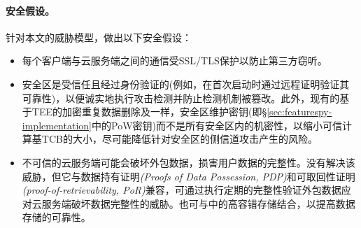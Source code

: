 \paragraph*{安全假设。}针对本文的威胁模型，做出以下安全假设：
\begin{itemize}
    \item 每个客户端与云服务端之间的通信受SSL/TLS保护以防止第三方窃听。
    \item 安全区是受信任且经过身份验证的(例如，在首次启动时通过远程证明验证其可靠性)，以便诚实地执行攻击检测并防止检测机制被篡改。此外，现有的基于TEE的加密重复数据删除\cite{shinde20}及\sysnameS 一样，安全区维护密钥(即\S\ref{sec:featurespy-implementation}中的PoW密钥)而不是所有安全区内的机密性，以缩小可信计算基TCB的大小，尽可能降低针对安全区的侧信道攻击产生的风险\cite{fei21}。
    \item 不可信的云服务端可能会破坏外包数据，损害用户数据的完整性。\sysnameF 没有解决该威胁，但它与数据持有证明\textit{(Proofs of Data Possession, PDP)}\cite{ateniese2007provable}和可取回性证明\textit{(proof-of-retrievability, PoR)}\cite{juels2007pors}兼容，可通过执行定期的完整性验证外包数据应对云服务端破坏数据完整性的威胁。\sysnameF 也可与\cite{li15}中的高容错存储结合，以提高数据存储的可靠性。
\end{itemize}